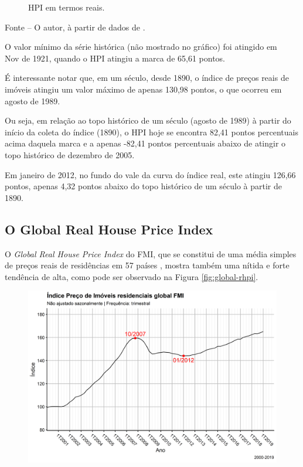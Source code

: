 \documentclass[
	12pt,				%
	oneside,			%
	a4paper,			%
	chapter=TITLE,		%
	section=TITLE,		%
	english,			%
	brazil				%
	]{abntex2}
\newcommand{\bcenter}{\begin{center}}
\newcommand{\ecenter}{\end{center}}
\begin{document}
\begin{refsection}
\begin{figure}[H]
{}

\caption{\gls{HPI} em termos reais.}\label{fig:rhpi2}
\end{figure}
\bcenter

\small Fonte -- O autor, à partir de dados de \textcite{QuandlWIKI}.
\ecenter

O valor mínimo da série histórica (não mostrado no gráfico) foi atingido em\\
Nov de
1921, quando o \gls{HPI} atingiu a marca de
65,61 pontos.

É interessante notar que, em um século, desde 1890, o índice de preços reais de
imóveis atingiu um valor máximo de apenas 130,98
pontos, o que ocorreu em agosto de 1989.

Ou seja, em relação ao topo histórico de um século (agosto de 1989) à partir do
início da coleta do índice (1890), o \gls{HPI} hoje se encontra
82,41 pontos percentuais acima daquela
marca e a apenas -82,41 pontos
percentuais abaixo de atingir o topo histórico de dezembro de 2005.

Em janeiro de 2012, no fundo do vale da curva do índice real, este atingiu
126,66 pontos, apenas
4,32 pontos abaixo do topo
histórico de um século à partir de 1890.

\hypertarget{o-global-real-house-price-index}{%
\subsection{O Global Real House Price Index}\label{o-global-real-house-price-index}}

O \emph{Global Real House Price Index} do \gls{FMI}, que se constitui de uma média
simples de preços reais de residências em 57 países \autocite{fmitwa}, mostra também uma
nítida e forte tendência de alta, como pode ser observado na Figura
\ref{fig:global-rhpi}.
\begin{figure}[H]

{\centering \includegraphics[width=0.7\linewidth]{images/global-rhpi-1} 

}
\end{figure}
\end{refsection}
\end{document}

